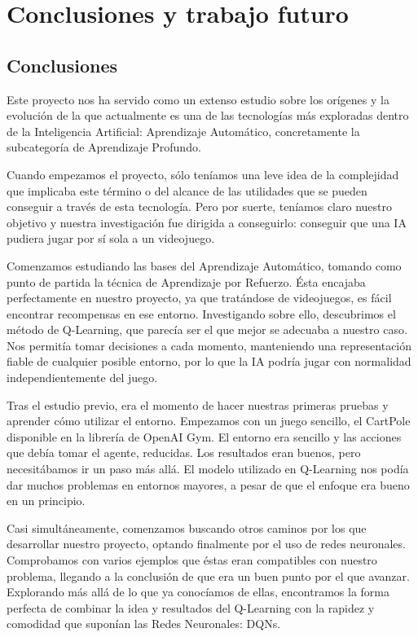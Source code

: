 \chapter{Conclusiones y trabajo futuro}
\label{cap:conclusiones}


\section{Conclusiones}

Este proyecto nos ha servido como un extenso estudio sobre los orígenes y la evolución de la que actualmente es una de las tecnologías más exploradas dentro de la Inteligencia Artificial: Aprendizaje Automático, concretamente la subcategoría de Aprendizaje Profundo. 

Cuando empezamos el proyecto, sólo teníamos una leve idea de la complejidad que implicaba este término o del alcance de las utilidades que se pueden conseguir a través de esta tecnología. Pero por suerte, teníamos claro nuestro objetivo y nuestra investigación fue dirigida a conseguirlo: conseguir que una IA pudiera jugar por sí sola a un videojuego.

Comenzamos estudiando las bases del Aprendizaje Automático, tomando como punto de partida la técnica de Aprendizaje por Refuerzo. Ésta encajaba perfectamente en nuestro proyecto, ya que tratándose de videojuegos, es fácil encontrar recompensas en ese entorno. Investigando sobre ello, descubrimos el método de Q-Learning, que parecía ser el que mejor se adecuaba a nuestro caso. Nos permitía tomar decisiones a cada momento, manteniendo una representación fiable de cualquier posible entorno, por lo que la IA podría jugar con normalidad independientemente del juego.

Tras el estudio previo, era el momento de hacer nuestras primeras pruebas y aprender cómo utilizar el entorno. Empezamos con un juego sencillo, el CartPole disponible en la librería de OpenAI Gym. El entorno era sencillo y las acciones que debía tomar el agente, reducidas. Los resultados eran buenos, pero necesitábamos ir un paso más allá. El modelo utilizado en Q-Learning nos podía dar muchos problemas en entornos mayores, a pesar de que el enfoque era bueno en un principio.

Casi simultáneamente, comenzamos buscando otros caminos por los que desarrollar nuestro proyecto, optando finalmente por el uso de redes neuronales. Comprobamos con varios ejemplos que éstas eran compatibles con nuestro problema, llegando a la conclusión de que era un buen punto por el que avanzar. Explorando más allá de lo que ya conocíamos de ellas, encontramos la forma perfecta de combinar la idea y resultados del Q-Learning con la rapidez y comodidad que suponían las Redes Neuronales: DQNs. 

